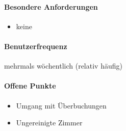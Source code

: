 \paragraph{Besondere Anforderungen}
\begin{itemize}
	\item keine
\end{itemize}


\paragraph{Benutzerfrequenz}
mehrmals wöchentlich (relativ häufig)

\paragraph{Offene Punkte}
\begin{itemize}
	\item Umgang mit Überbuchungen
	\item Ungereinigte Zimmer
\end{itemize}

\newpage

